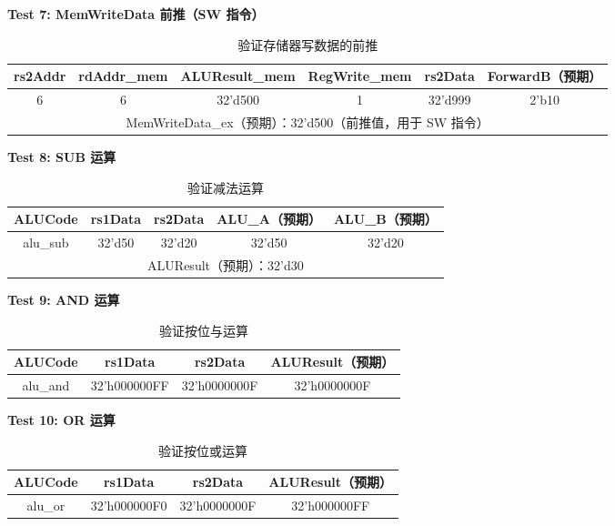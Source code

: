 \documentclass[12pt,a4paper]{article}
\begin{document}
\textbf{Test 7: MemWriteData 前推（SW 指令）}

\begin{table}[H]
\centering
\begin{tabular}{|c|c|c|c|c|c|}
\hline
rs2Addr & rdAddr\_mem & ALUResult\_mem & RegWrite\_mem & rs2Data & ForwardB（预期） \\ \hline
6 & 6 & 32'd500 & 1 & 32'd999 & 2'b10 \\ \hline
\multicolumn{6}{|c|}{MemWriteData\_ex（预期）：32'd500（前推值，用于 SW 指令）} \\ \hline
\end{tabular}
\caption{验证存储器写数据的前推}
\end{table}

\textbf{Test 8: SUB 运算}

\begin{table}[H]
\centering
\begin{tabular}{|c|c|c|c|c|}
\hline
ALUCode & rs1Data & rs2Data & ALU\_A（预期） & ALU\_B（预期） \\ \hline
alu\_sub & 32'd50 & 32'd20 & 32'd50 & 32'd20 \\ \hline
\multicolumn{5}{|c|}{ALUResult（预期）：32'd30} \\ \hline
\end{tabular}
\caption{验证减法运算}
\end{table}

\textbf{Test 9: AND 运算}

\begin{table}[H]
\centering
\begin{tabular}{|c|c|c|c|}
\hline
ALUCode & rs1Data & rs2Data & ALUResult（预期） \\ \hline
alu\_and & 32'h000000FF & 32'h0000000F & 32'h0000000F \\ \hline
\end{tabular}
\caption{验证按位与运算}
\end{table}

\textbf{Test 10: OR 运算}

\begin{table}[H]
\centering
\begin{tabular}{|c|c|c|c|}
\hline
ALUCode & rs1Data & rs2Data & ALUResult（预期） \\ \hline
alu\_or & 32'h000000F0 & 32'h0000000F & 32'h000000FF \\ \hline
\end{tabular}
\caption{验证按位或运算}
\end{table}
\end{document}
